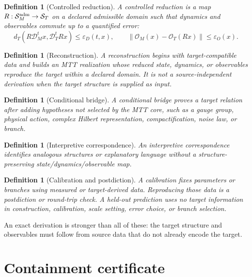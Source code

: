 \documentclass[11pt]{article}
\newtheorem{definition}[theorem]{Definition}
\begin{document}
\begin{definition}[Controlled reduction]
A controlled reduction is a map $R:\mathcal S_M^{\rm adm}\to\mathcal S_T$
on a declared admissible domain such that dynamics and observables commute up
to a quantified error:
\[
 d_T(R\mathcal D_M^t x,\mathcal D_T^tRx)\le\varepsilon_D(t,x),
 \qquad
 \|\mathcal O_M(x)-\mathcal O_T(Rx)\|\le\varepsilon_O(x).
\]
\end{definition}

\begin{definition}[Reconstruction]
A reconstruction begins with target-compatible data and builds an MTT
realization whose reduced state, dynamics, or observables reproduce the target
within a declared domain. It is not a source-independent derivation when the
target structure is supplied as input.
\end{definition}

\begin{definition}[Conditional bridge]
A conditional bridge proves a target relation after adding hypotheses not
selected by the MTT core, such as a gauge group, physical action, complex
Hilbert representation, compactification, noise law, or branch.
\end{definition}

\begin{definition}[Interpretive correspondence]
An interpretive correspondence identifies analogous structures or explanatory
language without a structure-preserving state/dynamics/observable map.
\end{definition}

\begin{definition}[Calibration and postdiction]
A calibration fixes parameters or branches using measured or target-derived
data. Reproducing those data is a postdiction or round-trip check. A held-out
prediction uses no target information in construction, calibration, scale
setting, error choice, or branch selection.
\end{definition}

An exact derivation is stronger than all of these: the target structure and
observables must follow from source data that do not already encode the target.

\section{Containment certificate}
\end{document}
